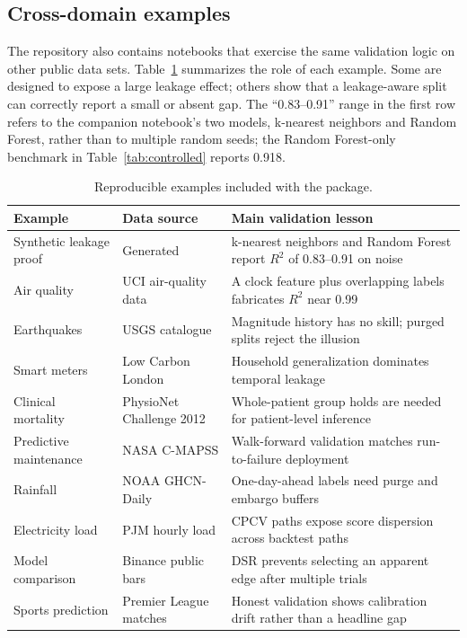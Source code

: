 \documentclass[article]{jdssv}
\begin{document}
\subsection{Cross-domain examples}

The repository also contains notebooks that exercise the same validation logic
on other public data sets. Table~\ref{tab:examples} summarizes the role of each
example. Some are designed to expose a large leakage effect; others show that a
leakage-aware split can correctly report a small or absent gap. The
``0.83--0.91'' range in the first row refers to the companion notebook's two
models, k-nearest neighbors and Random Forest, rather than to multiple random
seeds; the Random Forest-only benchmark in Table~\ref{tab:controlled} reports
0.918.

\begin{table}
\caption{Reproducible examples included with the package.}
\label{tab:examples}
\begin{center}
\small
\begin{tabular}{p{}p{}p{}}
\toprule
Example & Data source & Main validation lesson \\
\midrule
Synthetic leakage proof & Generated & k-nearest neighbors and Random Forest report $R^2$ of 0.83--0.91 on noise \\
Air quality & UCI air-quality data & A clock feature plus overlapping labels fabricates $R^2$ near 0.99 \\
Earthquakes & USGS catalogue & Magnitude history has no skill; purged splits reject the illusion \\
Smart meters & Low Carbon London & Household generalization dominates temporal leakage \\
Clinical mortality & PhysioNet Challenge 2012 & Whole-patient group holds are needed for patient-level inference \\
Predictive maintenance & NASA C-MAPSS & Walk-forward validation matches run-to-failure deployment \\
Rainfall & NOAA GHCN-Daily & One-day-ahead labels need purge and embargo buffers \\
Electricity load & PJM hourly load & CPCV paths expose score dispersion across backtest paths \\
Model comparison & Binance public bars & DSR prevents selecting an apparent edge after multiple trials \\
Sports prediction & Premier League matches & Honest validation shows calibration drift rather than a headline gap \\
\bottomrule
\end{tabular}
\end{center}
\end{table}
\end{document}
